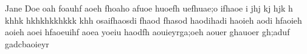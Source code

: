 \documentclass[journal]{IEEEtran}
\begin{document}

\begin{IEEEbiographynophoto}{Jane Doe}
oah foauhf aoeh fhoaho  afuoe huoefh uefhuae;o ifhaoe i jhj kj hjk h khhk hkhkhkkhkkk khh  osaifhaosdi fhaod fhasod haodihadi haoieh aodi hfaoieh aoieh aoei hfaoeuihf aoea yoeiu haodfh aouieyrga;oeh aouer ghauoer gh;aduf gadcbaoieyr
\end{IEEEbiographynophoto}






\end{document}
